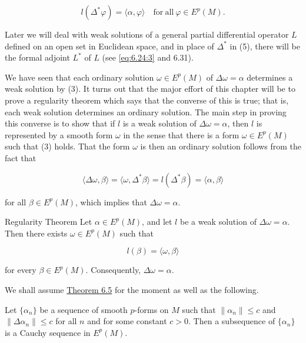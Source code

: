 \begin{definition}
\begin{equation}
\tag{5}\label{eq:6.4:5}
l(\Delta^{*}\varphi)=\langle\alpha,\varphi\rangle\quad\mathrm{for\ all}\ \varphi\in E^{p}(M).
\end{equation}

Later we will deal with weak solutions of a general partial differential operator $L$ defined on an open set in Euclidean space, and in place of $\Delta^{*}$ in (5), there will be the formal adjoint $L^{*}$ of $L$ (see \eqref{eq:6.24:3} and 6.31).

We have seen that each ordinary solution  $ \omega \in E^p(M) $ of  $ \Delta\omega = \alpha $ determines a weak solution by (3). It turns out that the major effort of this chapter will be to prove a regularity theorem which says that the converse of this is true; that is, each weak solution determines an ordinary solution. The main step in proving this converse is to show that if  $ l $ is a weak solution of  $ \Delta\omega = \alpha $, then  $ l $ is represented by a smooth form  $ \omega $ in the sense that there is a form  $ \omega \in E^p(M) $ such that (3) holds. That the form  $ \omega $ is then an ordinary solution follows from the fact that

\begin{equation}
\tag{6}\label{eq:6.4:6}
\langle\Delta\omega,\beta\rangle=\langle\omega,\Delta^{*}\beta\rangle=l(\Delta^{*}\beta)=\langle\alpha,\beta\rangle
\end{equation}

for all  $ \beta \in E^p(M) $, which implies that  $ \Delta\omega = \alpha $.
\end{definition}

\begin{theorem}{Regularity Theorem}\label{thm:6.5}
Let  $ \alpha \in E^p(M) $, and let  $ l $ be a weak solution of  $ \Delta\omega = \alpha $. Then there exists  $ \omega \in E^p(M) $ such that 

\[
l(\beta)=\langle\omega,\beta\rangle
\]

for every  $ \beta \in E^p(M) $. Consequently,  $ \Delta\omega = \alpha $.
\end{theorem}

We shall assume \hyperref[thm:6.5]{Theorem 6.5} for the moment as well as the following.

\begin{theorem}\label{thm:6.6}
Let $\{\alpha_n\}$ be a sequence of smooth $p$-forms on $M$ such that $\|\alpha_n\| \leq c$ and $\|\Delta\alpha_n\| \leq c$ for all $n$ and for some constant $c > 0$. Then a subsequence of $\{\alpha_n\}$ is a Cauchy sequence in $E^p(M)$.
\end{theorem}

